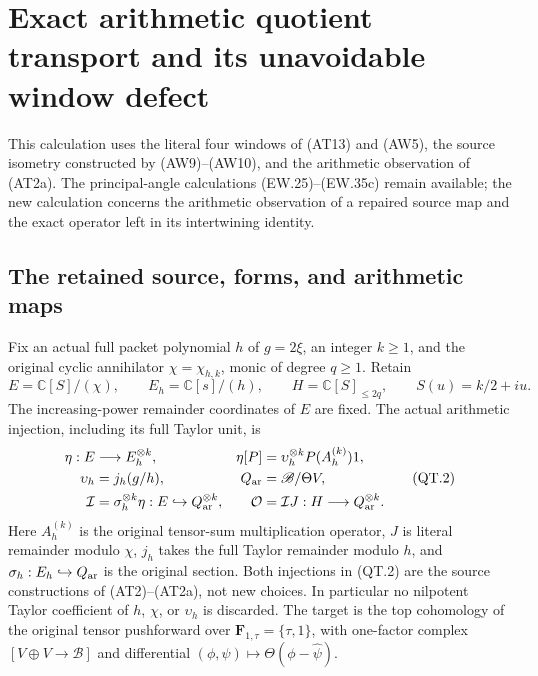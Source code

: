 \section{Exact arithmetic quotient transport and its unavoidable window defect}
\label{CFStage:sec:qt-transport}

This calculation uses the literal four windows of (AT13) and (AW5),
the source isometry constructed by (AW9)--(AW10), and the arithmetic
observation of (AT2a). The principal-angle calculations (EW.25)--(EW.35c)
remain available; the new calculation concerns the arithmetic observation
of a repaired source map and the exact operator left in its intertwining
identity.

\subsection{The retained source, forms, and arithmetic maps}

Fix an actual full packet polynomial \(h\) of \(g=2\xi\), an integer
\(k\ge1\), and the original cyclic annihilator \(\chi=\chi_{h,k}\),
monic of degree \(q\ge1\). Retain
\[
 E=\mathbb C[S]/(\chi),\qquad E_h=\mathbb C[s]/(h),\qquad
 H=\mathbb C[S]_{\le2q},\qquad S(u)=k/2+iu.
 \tag{QT.1}\label{CFStage:eq:qt-objects}
\]
The increasing-power remainder coordinates of \(E\) are fixed.
The actual arithmetic injection, including its full Taylor unit, is
\[
 \begin{aligned}
 \eta:E&\longrightarrow E_h^{\otimes k},&
 \eta[P]&=\upsilon_h^{\otimes k}P(A_h^{(k)})1,\\
 \upsilon_h&=j_h(g/h),&
 Q_{\rm ar}&=\mathscr B/\Theta V,\\
 \mathcal I&=\sigma_h^{\otimes k}\eta:
                  E\hookrightarrow Q_{\rm ar}^{\otimes k},&
 \mathcal O&=\mathcal I J:H\longrightarrow Q_{\rm ar}^{\otimes k}.
 \end{aligned}
 \tag{QT.2}\label{CFStage:eq:qt-observation}
\]
Here \(A_h^{(k)}\) is the original tensor-sum multiplication operator,
\(J\) is literal remainder modulo \(\chi\), \(j_h\) takes the full
Taylor remainder modulo \(h\), and \(\sigma_h:E_h\hookrightarrow Q_{\rm ar}\)
is the original section. Both injections in (QT.2) are the source
constructions of (AT2)--(AT2a), not new choices. In particular no
nilpotent Taylor coefficient of \(h\), \(\chi\), or \(\upsilon_h\)
is discarded. The target is the top cohomology of the original tensor
pushforward over \(\mathbf F_{1,\tau}=\{\tau,1\}\), with one-factor
complex \([V\oplus V\longrightarrow\mathscr B]\) and differential
\((\phi,\psi)\mapsto\Theta(\phi-\widehat\psi)\).

